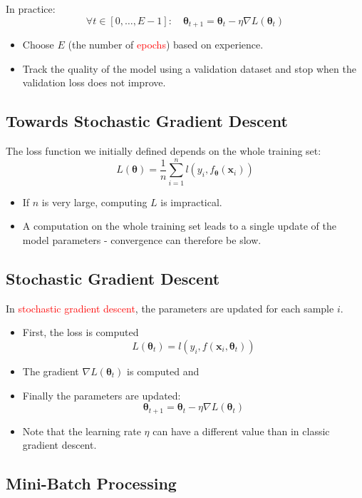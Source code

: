 \documentclass{book}
\newcommand{\x}{\mathbf{x}}
\newcommand{\lr}{\eta} %
\newcommand{\loss}{L}
\newcommand{\param}{\boldsymbol{\theta}}
\newcommand{\alert}[1]{\textcolor{red}{#1}}
\begin{document}
In practice:
\[
\forall t \in [0, \ldots, E-1]:\quad \param_{t+1} = \param_t - \lr \nabla \loss(\param_t)
\]

\begin{itemize}
\item Choose $E$ (the number of \alert{epochs}) based on experience.
\item Track the quality of the model using a validation dataset and stop when the validation loss does not improve.
\end{itemize}

\subsection{Towards Stochastic Gradient Descent}

The loss function we initially defined depends on the whole training set:
\[
\loss(\param) = \frac{1}{n} \sum\limits_{i=1}^n l(y_i, f_{\param}(\x_i))
\]

\begin{itemize}
\item If $n$ is very large, computing $\loss$ is impractical.
\item A computation on the whole training set leads to a single update of the model parameters - convergence can therefore be slow.
\end{itemize}

\subsection{Stochastic Gradient Descent}

In \alert{stochastic gradient descent}, the parameters are updated for each sample $i$.

\begin{itemize}
\item First, the loss is computed
\[
\loss(\param_t) = l(y_i, f(\x_i, \param_t))
\]
\item The gradient $\nabla \loss(\param_t)$ is computed and
\item Finally the parameters are updated:
\[
\param_{t+1} = \param_t - \lr\nabla \loss(\param_t)
\]
\item Note that the learning rate $\lr$ can have a different value than in classic gradient descent.
\end{itemize}

\subsection{Mini-Batch Processing}
\end{document}
